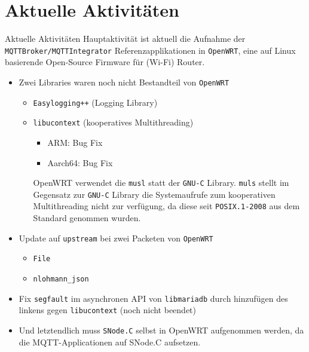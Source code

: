 ﻿\part{Aktuelle Aktivitäten}

\begin{frame}{Aktuelle Aktivitäten}
  Hauptaktivität ist aktuell die \alert{Aufnahme} der \alert{\texttt{MQTTBroker/MQTTIntegrator}} Referenzapplikationen in \alert{\texttt{OpenWRT}}, eine auf \alert{Linux} basierende \alert{Open-Source Firmware} für (Wi-Fi) Router.

  \begin{itemize}
    \item Zwei Libraries waren noch nicht Bestandteil von \texttt{OpenWRT}
    \begin{itemize}
      \item \alert{\texttt{Easylogging++}} (Logging Library)
      \item \alert{\texttt{libucontext}} (kooperatives Multithreading)
      \begin{itemize}
        \item ARM: Bug Fix
        \item Aarch64: Bug Fix
      \end{itemize}
      OpenWRT verwendet die \alert{\texttt{musl}} statt der \alert{\texttt{GNU-C}} Library. \texttt{muls} stellt im Gegensatz zur \texttt{GNU-C} Library die Systemaufrufe zum kooperativen Multithreading nicht zur verfügung, da diese seit \texttt{POSIX.1-2008} aus dem Standard genommen wurden.
    \end{itemize}
    \item Update auf \alert{\texttt{upstream}} bei zwei Packeten von \texttt{OpenWRT}
    \begin{itemize}
      \item \alert{\texttt{File}}
      \item \alert{\texttt{nlohmann\_json}}
    \end{itemize}
    \item Fix \alert{\texttt{segfault}} im \alert{asynchronen API} von \alert{\texttt{libmariadb}} durch hinzufügen des linkens gegen \alert{\texttt{libucontext}} (noch nicht beendet)
    \item Und letztendlich muss \alert{\texttt{SNode.C}} selbst in OpenWRT aufgenommen werden, da die MQTT-Applicationen auf SNode.C aufsetzen.
  \end{itemize}
\end{frame}
